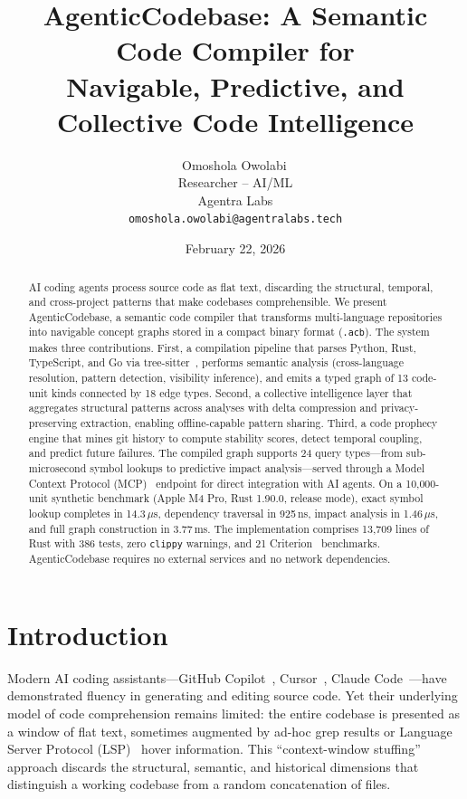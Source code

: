 \documentclass[10pt, twocolumn]{article}
\title{\textbf{AgenticCodebase: A Semantic Code Compiler for\\Navigable, Predictive, and Collective Code Intelligence}}
\author{Omoshola Owolabi\,\orcidlink{0009-0006-4089-0732}\\Researcher -- AI/ML\\Agentra Labs\\\texttt{omoshola.owolabi@agentralabs.tech}}
\date{February 22, 2026}
\newcommand{\acb}{AgenticCodebase\xspace}
\newcommand{\acbfile}{\texttt{.acb}\xspace}
\begin{document}
\maketitle
\thispagestyle{fancy}

\begin{abstract}
AI coding agents process source code as flat text, discarding the structural, temporal, and cross-project patterns that make codebases comprehensible. We present \acb, a semantic code compiler that transforms multi-language repositories into navigable concept graphs stored in a compact binary format (\acbfile). The system makes three contributions. First, a compilation pipeline that parses Python, Rust, TypeScript, and Go via tree-sitter~\cite{treesitter2018}, performs semantic analysis (cross-language resolution, pattern detection, visibility inference), and emits a typed graph of 13 code-unit kinds connected by 18 edge types. Second, a collective intelligence layer that aggregates structural patterns across analyses with delta compression and privacy-preserving extraction, enabling offline-capable pattern sharing. Third, a code prophecy engine that mines git history to compute stability scores, detect temporal coupling, and predict future failures. The compiled graph supports 24 query types---from sub-microsecond symbol lookups to predictive impact analysis---served through a Model Context Protocol (MCP)~\cite{mcp2024} endpoint for direct integration with AI agents. On a 10{,}000-unit synthetic benchmark (Apple M4 Pro, Rust 1.90.0, release mode), exact symbol lookup completes in 14.3\,$\mu$s, dependency traversal in 925\,ns, impact analysis in 1.46\,$\mu$s, and full graph construction in 3.77\,ms. The implementation comprises 13{,}709 lines of Rust with 386 tests, zero \texttt{clippy} warnings, and 21 Criterion~\cite{criterion2023} benchmarks. AgenticCodebase requires no external services and no network dependencies.
\end{abstract}

\section{Introduction}
\label{sec:intro}

Modern AI coding assistants---GitHub Copilot~\cite{copilot2021}, Cursor~\cite{cursor2024}, Claude Code~\cite{claudecode2025}---have demonstrated fluency in generating and editing source code. Yet their underlying model of code comprehension remains limited: the entire codebase is presented as a window of flat text, sometimes augmented by ad-hoc grep results or Language Server Protocol (LSP)~\cite{lsp2024} hover information. This ``context-window stuffing'' approach discards the structural, semantic, and historical dimensions that distinguish a working codebase from a random concatenation of files.
\end{document}
